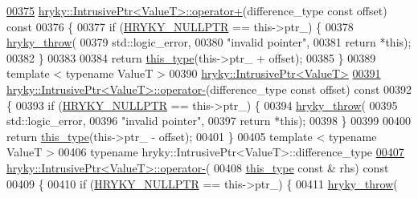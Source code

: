 \begin{DoxyCode}
\hypertarget{intrusive__ptr_8h_source_l00375}{}\hyperlink{classhryky_1_1_intrusive_ptr_aa9e65b5fa7be40a26c4e3e386fc0510b}{00375} \hyperlink{classhryky_1_1_intrusive_ptr}{hryky::IntrusivePtr<ValueT>::operator+}(difference\_type \textcolor{keyword}{const} offset)\textcolor{keyword}{ const}
00376 \textcolor{keyword}{}\{
00377     \textcolor{keywordflow}{if} (\hyperlink{common_8h_a4cd4ac09cfcdbd6b30ee69afc156e210}{HRYKY_NULLPTR} == this->ptr\_) \{
00378         \hyperlink{debug__common_8h_af50606eac4009921527ddcaed392b2c2}{hryky_throw}(
00379             std::logic\_error,
00380             \textcolor{stringliteral}{"invalid pointer"},
00381             \textcolor{keywordflow}{return} *\textcolor{keyword}{this});
00382     \}
00383 
00384     \textcolor{keywordflow}{return} \hyperlink{classhryky_1_1_intrusive_ptr}{this_type}(this->ptr\_ + offset);
00385 \}
00389 \textcolor{keyword}{template} < \textcolor{keyword}{typename} ValueT >
00390 \hyperlink{classhryky_1_1_intrusive_ptr}{hryky::IntrusivePtr<ValueT>}
\hypertarget{intrusive__ptr_8h_source_l00391}{}\hyperlink{classhryky_1_1_intrusive_ptr_ac4f08eb767652220bbf2a379cf988bf0}{00391} \hyperlink{classhryky_1_1_intrusive_ptr}{hryky::IntrusivePtr<ValueT>::operator-}(difference\_type \textcolor{keyword}{const} offset)\textcolor{keyword}{ const}
00392 \textcolor{keyword}{}\{
00393     \textcolor{keywordflow}{if} (\hyperlink{common_8h_a4cd4ac09cfcdbd6b30ee69afc156e210}{HRYKY_NULLPTR} == this->ptr\_) \{
00394         \hyperlink{debug__common_8h_af50606eac4009921527ddcaed392b2c2}{hryky_throw}(
00395             std::logic\_error,
00396             \textcolor{stringliteral}{"invalid pointer"},
00397             \textcolor{keywordflow}{return} *\textcolor{keyword}{this});
00398     \}
00399 
00400     \textcolor{keywordflow}{return} \hyperlink{classhryky_1_1_intrusive_ptr}{this_type}(this->ptr\_ - offset);
00401 \}
00405 \textcolor{keyword}{template} < \textcolor{keyword}{typename} ValueT >
00406 \textcolor{keyword}{typename} hryky::IntrusivePtr<ValueT>::difference\_type 
\hypertarget{intrusive__ptr_8h_source_l00407}{}\hyperlink{classhryky_1_1_intrusive_ptr_a3952428634c9139f288f8bc08fcdcb6c}{00407} \hyperlink{classhryky_1_1_intrusive_ptr}{hryky::IntrusivePtr<ValueT>::operator-}(
00408     \hyperlink{classhryky_1_1_intrusive_ptr}{this_type} \textcolor{keyword}{const} & rhs)\textcolor{keyword}{ const}
00409 \textcolor{keyword}{}\{
00410     \textcolor{keywordflow}{if} (\hyperlink{common_8h_a4cd4ac09cfcdbd6b30ee69afc156e210}{HRYKY_NULLPTR} == this->ptr\_) \{
00411         \hyperlink{debug__common_8h_af50606eac4009921527ddcaed392b2c2}{hryky_throw}(

\end{DoxyCode}
